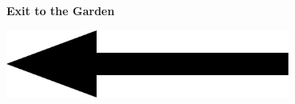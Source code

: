 \documentclass[a4paper]{article}
\begin{document}
\printGenericVSLHeader
\begin{center}
\begin{vsltext}{3cm}{4.5cm}

   \vspace{0.5cm} 

    \textbf{Exit to the Garden} 

    \vspace{2.5cm}

    \includegraphics[width=0.7\textwidth, keepaspectratio=true]{arrow_left.pdf}

\end{vsltext}

\end{center}
\end{document}
